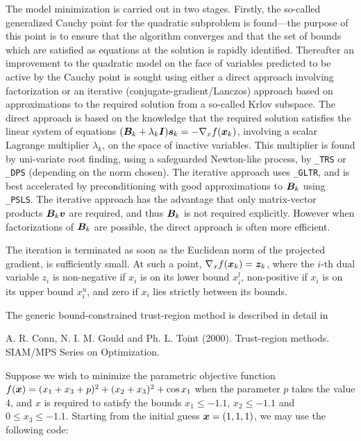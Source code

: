 \documentclass{galahad}
\begin{document}
The model minimization is carried out in two stages.
Firstly, the so-called generalized Cauchy point for the quadratic
subproblem is found---the purpose of this point is to ensure that the
algorithm converges and that the set of bounds which are satisfied as
equations at the solution is rapidly identified.  Thereafter an
improvement to the quadratic model on the face of variables predicted
to be active by the Cauchy point is sought using either a
direct approach involving factorization or an
iterative (conjugate-gradient/Lanczos) approach based on approximations
to the required solution from a so-called Krlov subspace. The direct
approach is based on the knowledge that the required solution
satisfies the linear system of equations $({\bm{B}}_k + \lambda_k {\bm{I}}) {\bm{s}}_k
= - \nabla_x f({\bm{x}}_k)$, involving a scalar Lagrange multiplier $\lambda_k$,
on the space of inactive variables.
This multiplier is found by uni-variate root finding, using a safeguarded
Newton-like process, by {\tt \libraryname\_TRS} or {\tt \libraryname\_DPS}
(depending on the norm chosen). The iterative approach
uses {\tt \libraryname\_GLTR}, and is best accelerated by preconditioning
with good approximations to ${\bm{B}}_k$ using {\tt \libraryname\_PSLS}. The
iterative approach has the advantage that only matrix-vector products
${\bm{B}}_k {\bm{v}}$ are required, and thus ${\bm{B}}_k$ is not required explicitly.
However when factorizations of ${\bm{B}}_k$ are possible, the direct approach
is often more efficient.
\vspace*{1mm}

The iteration is terminated as soon as the Euclidean norm of the 
projected gradient,
is sufficiently small. At such a point, $\nabla_x f({\bm{x}}_k) = {\bm{z}}_k$, 
where the $i$-th dual variable $z_i$ is non-negative if $x_i$ is on its
lower bound $x^l_i$, non-positive if $x_i$ is on its upper bound $x^u_i$,
and zero if $x_i$ lies strictly between its bounds.

\galreferences
\vspace*{1mm}

\noindent
The generic bound-constrained trust-region method is described in detail in
\vspace*{1mm}

\noindent
A. R. Conn, N. I. M. Gould and Ph. L. Toint (2000).
Trust-region methods.
SIAM/MPS Series on Optimization.


\galexamples
Suppose we wish to minimize the parametric objective function
$f({\bm{x}}) = ( x_1 + x_3 + p )^2 + ( x_2 + x_3 )^2 + \cos x_1$
when the parameter $p$ takes the value 4, and $x$ is required to satisfy 
the  bounds $x_1 \leq -1.1$, $x_2 \leq -1.1$ and $0 \leq x_3 \leq -1.1$. 
Starting from the initial guess ${\bm{x}} = (1,1,1)$, we may use the following code:
\end{document}
